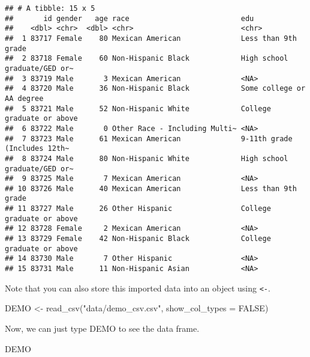 \documentclass[
]{book}
\newenvironment{Shaded}{\begin{snugshade}}{\end{snugshade}}
\newcommand{\AttributeTok}[1]{\textcolor[rgb]{0.77,0.63,0.00}{#1}}
\newcommand{\ConstantTok}[1]{\textcolor[rgb]{0.00,0.00,0.00}{#1}}
\newcommand{\FunctionTok}[1]{\textcolor[rgb]{0.00,0.00,0.00}{#1}}
\newcommand{\NormalTok}[1]{#1}
\newcommand{\OtherTok}[1]{\textcolor[rgb]{0.56,0.35,0.01}{#1}}
\newcommand{\StringTok}[1]{\textcolor[rgb]{0.31,0.60,0.02}{#1}}
\begin{document}
\begin{verbatim}
## # A tibble: 15 x 5
##       id gender   age race                          edu                         
##    <dbl> <chr>  <dbl> <chr>                         <chr>                       
##  1 83717 Female    80 Mexican American              Less than 9th grade         
##  2 83718 Female    60 Non-Hispanic Black            High school graduate/GED or~
##  3 83719 Male       3 Mexican American              <NA>                        
##  4 83720 Male      36 Non-Hispanic Black            Some college or AA degree   
##  5 83721 Male      52 Non-Hispanic White            College graduate or above   
##  6 83722 Male       0 Other Race - Including Multi~ <NA>                        
##  7 83723 Male      61 Mexican American              9-11th grade (Includes 12th~
##  8 83724 Male      80 Non-Hispanic White            High school graduate/GED or~
##  9 83725 Male       7 Mexican American              <NA>                        
## 10 83726 Male      40 Mexican American              Less than 9th grade         
## 11 83727 Male      26 Other Hispanic                College graduate or above   
## 12 83728 Female     2 Mexican American              <NA>                        
## 13 83729 Female    42 Non-Hispanic Black            College graduate or above   
## 14 83730 Male       7 Other Hispanic                <NA>                        
## 15 83731 Male      11 Non-Hispanic Asian            <NA>
\end{verbatim}

Note that you can also store this imported data into an object using \texttt{\textless{}-}.

\begin{Shaded}
\begin{Highlighting}[]
\NormalTok{DEMO }\OtherTok{\textless{}{-}} \FunctionTok{read\_csv}\NormalTok{(}\StringTok{"data/demo\_csv.csv"}\NormalTok{, }\AttributeTok{show\_col\_types =} \ConstantTok{FALSE}\NormalTok{)}
\end{Highlighting}
\end{Shaded}

Now, we can just type DEMO to see the data frame.

\begin{Shaded}
\begin{Highlighting}[]
\NormalTok{DEMO}
\end{Highlighting}
\end{Shaded}
\end{document}
